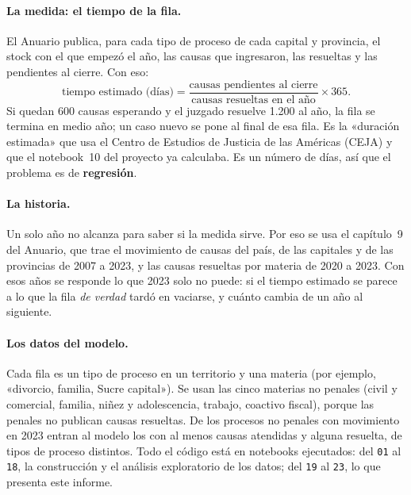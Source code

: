 \documentclass[11pt,a4paper]{article}
\begin{document}
\paragraph{La medida: el tiempo de la fila.} El Anuario publica, para cada tipo de proceso de cada capital y provincia,
el stock con el que empezó el año, las causas que ingresaron, las resueltas y las pendientes al cierre. Con eso:
\begin{equation*}
  \text{tiempo estimado (días)} = \frac{\text{causas pendientes al cierre}}{\text{causas resueltas en el año}}\times 365 .
\end{equation*}
Si quedan 600 causas esperando y el juzgado resuelve 1.200 al año, la fila se termina en medio año; un caso nuevo se pone
al final de esa fila. Es la «duración estimada» que usa el Centro de Estudios de Justicia de las Américas (CEJA) y que el
notebook~10 del proyecto ya calculaba. Es un número de días, así que el problema es de \textbf{regresión}.

\paragraph{La historia.} Un solo año no alcanza para saber si la medida sirve. Por eso se usa el capítulo~9 del Anuario,
que trae el movimiento de causas del país, de las capitales y de las provincias de 2007 a 2023, y las causas resueltas por
materia de 2020 a 2023. Con esos años se responde lo que 2023 solo no puede: si el tiempo estimado se parece a lo que la
fila \emph{de verdad} tardó en vaciarse, y cuánto cambia de un año al siguiente.

\paragraph{Los datos del modelo.} Cada fila es un tipo de proceso en un territorio y una materia (por ejemplo,
«divorcio, familia, Sucre capital»). Se usan las cinco materias no penales (civil y comercial, familia, niñez y
adolescencia, trabajo, coactivo fiscal), porque las penales no publican causas resueltas. De los \nProcesos{} procesos no
penales con movimiento en 2023 entran al modelo los \nFilas{} con al menos \minCausas{} causas atendidas y alguna resuelta,
de \nTiposProceso{} tipos de proceso distintos. Todo el código está en notebooks ejecutados: del \texttt{01} al
\texttt{18}, la construcción y el análisis exploratorio de los datos; del \texttt{19} al \texttt{23}, lo que presenta
este informe.

\end{document}
